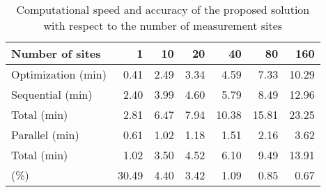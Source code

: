 \begin{table*}
  \centering
  \caption{
    Computational speed and accuracy of the proposed solution with respect to
    the number of measurement sites
  }
  \ttfamily
  \begin{tabular}{lrrrrrr}
    \toprule
    \textnormal{Number of sites}    &     1 &   10 &   20 &    40 &    80 &   160 \\
    \midrule
    \textnormal{Optimization (min)} &  0.41 & 2.49 & 3.34 &  4.59 &  7.33 & 10.29 \\
    \midrule
    \textnormal{Sequential (min)}   &  2.40 & 3.99 & 4.60 &  5.79 &  8.49 & 12.96 \\
    \textnormal{Total (min)}        &  2.81 & 6.47 & 7.94 & 10.38 & 15.81 & 23.25 \\
    \midrule
    \textnormal{Parallel (min)}     &  0.61 & 1.02 & 1.18 &  1.51 &  2.16 &  3.62 \\
    \textnormal{Total (min)}        &  1.02 & 3.50 & 4.52 &  6.10 &  9.49 & 13.91 \\
    \midrule
    \textnormal{\up{NRMSE} (\%)}    & 30.49 & 4.40 & 3.42 &  1.09 &  0.85 &  0.67 \\
    \bottomrule
  \end{tabular}
\end{table*}
